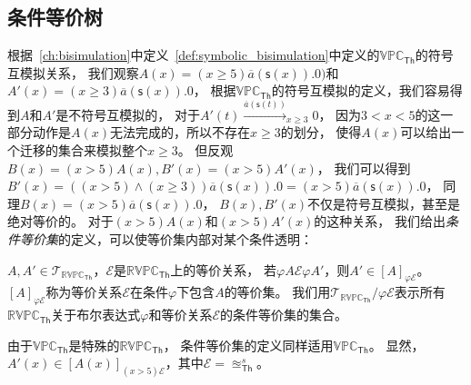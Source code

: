    \subsection{条件等价树}

   根据~\ref{ch:bisimulation}中定义~\ref{def:symbolic_bisimulation}中定义的$\mathbb{VPC}_{\mathsf{Th}}$的符号互模拟关系，
   我们观察$A(x)=(x\geq 5)\overline{a}(\mathsf{s}(x)).0)$和$A'(x)=(x\geq 3)\overline{a}(\mathsf{s}(x)).0$，
   根据$\mathbb{VPC}_\mathsf{Th}$的符号互模拟的定义，我们容易得到$A$和$A'$是不符号互模拟的，
   对于$A'(t)\stackrel{\overline{a}(\mathsf{s}(t))}{\longrightarrow}_{x\geq 3} 0$，
   因为$3<x<5$的这一部分动作是$A(x)$无法完成的，所以不存在$x\geq 3$的划分，
   使得$A(x)$可以给出一个迁移的集合来模拟整个$x\geq 3$。
   但反观$B(x)=(x>5)A(x),B'(x)=(x>5)A'(x)$，
   我们可以得到$B'(x)=((x>5)\wedge(x\geq 3))\overline{a}(\mathsf{s}(x)).0=(x>5)\overline{a}(\mathsf{s}(x)).0$，
   同理$B(x)=(x>5)\overline{a}(\mathsf{s}(x)).0$，
   $B(x),B'(x)$不仅是符号互模拟，甚至是绝对等价的。
   对于$(x>5)A(x)$和$(x>5)A'(x)$的这种关系，
   我们给出\textit{条件等价集}的定义，可以使等价集内部对某个条件透明：

   \begin{definition}[条件等价集]
     $A,A'\in \mathcal{T}_{\mathbb{RVPC}_{\mathsf{Th}}}$，$\mathcal{E}$是$\mathbb{RVPC}_{\mathsf{Th}}$上的等价关系，
     若$\varphi A \mathcal{E} \varphi A'$，则$A'\in [A]_{\varphi \mathcal{E}}$。
     $[A]_{\varphi \mathcal{E}}$称为等价关系$\mathcal{E}$在条件$\varphi$下包含$A$的等价集。 
     我们用$\mathcal{T}_{\mathbb{RVPC}_{\mathsf{Th}}}/\varphi \mathcal{E}$表示所有$\mathbb{RVPC}_{\mathsf{Th}}$关于布尔表达式$\varphi$和等价关系$\mathcal{E}$的条件等价集的集合。 
   \end{definition} 

   由于$\mathbb{VPC}_{\mathsf{Th}}$是特殊的$\mathbb{RVPC}_{\mathsf{Th}}$，
   条件等价集的定义同样适用$\mathbb{VPC}_{\mathsf{Th}}$。
   显然，$A'(x)\in [A(x)]_{(x>5)\mathcal{E}}$，其中$\mathcal{E}=\approxeq_{\mathsf{Th}}^s$。
   
